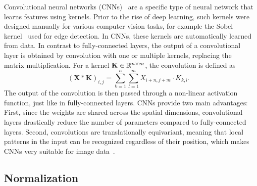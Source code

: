 Convolutional neural networks (CNNs)~\cite{CNN} are a specific type of neural network that learns features using
kernels.
Prior to the rise of deep learning, such kernels were designed manually for various computer vision tasks, for example
the Sobel kernel~\cite{Sobel} used for edge detection.
In CNNs, these kernels are automatically learned from data. In contrast to fully-connected layers, the output of a
convolutional layer is obtained by convolution with one or multiple kernels, replacing the matrix multiplication.
For a kernel $\mathbf{K} \in \mathbb{R}^{n \times m}$, the convolution is defined as
\begin{equation}
    (\mathbf{X} \ast \mathbf{K})_{i,j} = \sum_{k=1}^{n}\sum_{l=1}^{m} X_{i+n,j+m} \cdot K_{k,l}.
\end{equation}
The output of the convolution is then passed through a non-linear activation function, just like in fully-connected
layers.
CNNs provide two main advantages: First, since the weights are shared across the spatial dimensions, convolutional
layers drastically reduce the number of parameters compared to fully-connected layers. 
Second, convolutions are translationally equivariant, meaning that local patterns in the input can be recognized 
regardless of their position, which makes CNNs very suitable for image data~\cite{DeepLearning}.

\subsection{Normalization}

\newcommand{\cube}[2]{
    \fill[gray!10, opacity=0.5] (0,0,\a) -- (\a,0,\a) -- (\a,\a,\a) -- (0,\a,\a) -- cycle;
    \fill[gray!10, opacity=0.5] (0,0,0) -- (\a,0,0) -- (\a,0,\a) -- (0,0,\a) -- cycle;
    \fill[gray!10, opacity=0.5] (0,0,0) -- (0,\a,0) -- (0,\a,\a) -- (0,0,\a) -- cycle;

    \draw[thick] (0,#1,0) -- (0,0,0) -- (#1,0,0);
    \draw[thick] (0,#1,0) -- (0,#1,#1);
    \draw[thick] (0,0,0) -- (0,0,#1);
    \draw[thick] (#1,0,0) -- (#1,0,#1);
    \draw[thick] (0,#1,#1) -- (0,0,#1) -- (#1,0,#1) -- (#1,#1,#1) -- cycle;

    \foreach \i in {1,2,...,#1} {
        \draw[very thin] (0,\i,0) -- (0,\i,#1);
        \draw[very thin] (0,0,\i) -- (0,#1,\i);

        \draw[very thin] (\i,0,0) -- (\i,0,#1);
        \draw[very thin] (0,0,\i) -- (#1,0,\i);

        \draw[very thin] (\i,0,#1) -- (\i,#1,#1);
        \draw[very thin] (0,\i,#1) -- (#1,\i,#1);
    }

    \node[rotate=90] at (0,#1,#1/2) [above] {$H,W$};
    \node at (0,#1/2,0) [below left] {$C$};
    \node at (#1/2,0,0) [below right] {$N$};

    \node at (#1,#1,#1+1) {#2};
}

